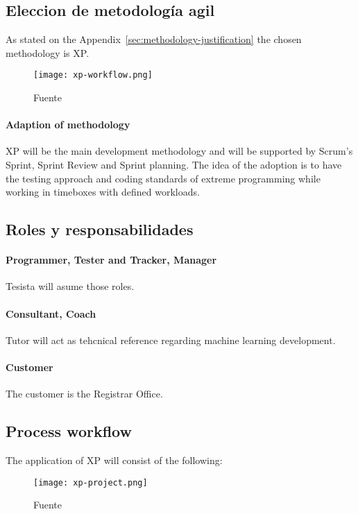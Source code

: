 \subsection{Eleccion de metodología agil}

As stated on the Appendix~\ref{sec:methodology-justification} the chosen methodology is XP.

\begin{figure}
    \caption{Fuente \textcite{abrahamsson2017agile}}\label{fig:xp-workflow}
    \texttt{[image: xp-workflow.png]}
\end{figure}

\paragraph{Adaption of methodology} XP will be the main development methodology and will be supported by Scrum's Sprint, Sprint Review and Sprint planning.
The idea of the adoption is to have the testing approach and coding standards of extreme programming while working in timeboxes with defined workloads.

\subsection{Roles y responsabilidades}

\paragraph{Programmer, Tester and Tracker, Manager} Tesista will asume those roles.

\paragraph{Consultant, Coach} Tutor will act as tehcnical reference regarding machine learning development.

\paragraph{Customer} The customer is the Registrar Office.

\subsection{Process workflow}
The application of XP will consist of the following:

\begin{figure}
    \caption{Fuente \textcite{XpWeb}}\label{fig:xp-project}
    \texttt{[image: xp-project.png]}
\end{figure}

